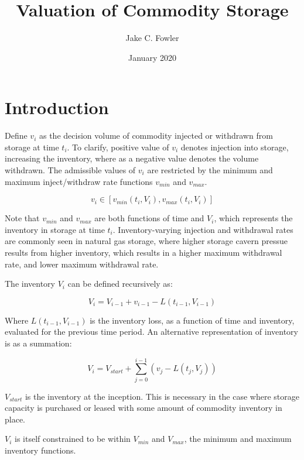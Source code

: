 \documentclass{article}
\title{Valuation of Commodity Storage}
\author{Jake C. Fowler}
\date{January 2020}
\begin{document}
\newcommand{\+}[1]{\ensuremath{\mathbf{#1}}}

\maketitle

\section{Introduction}
Define $v_i$ as the decision volume of commodity injected or withdrawn from storage at time
$t_i$. To clarify, positive value of $v_i$ denotes injection into storage, increasing the
inventory, where as a negative value denotes the volume withdrawn. The admissible values
of $v_i$ are restricted by the minimum and maximum inject/withdraw rate functions
$v_{min}$ and $v_{max}$.

\begin{equation}
    v_i \in [v_{min}(t_i, V_i), v_{max}(t_i, V_i)]
\end{equation}

Note that $v_{min}$ and $v_{max}$ are both functions of time and $V_i$, which represents the
inventory in storage at time $t_i$. Inventory-varying injection and withdrawal rates are commonly
seen in natural gas storage, where higher storage cavern pressue results from higher inventory,
which results in a higher maximum withdrawal rate, and lower maximum withdrawal rate.

\bigskip

The inventory $V_i$ can be defined recursively as:

\begin{equation}
    V_i = V_{i-1} + v_{i-1} - L(t_{i-1}, V_{i-1}) 
\end{equation}

Where $L(t_{i-1}, V_{i-1})$ is the inventory loss, as a function of time and inventory, 
evaluated for the previous time period. An alternative representation of inventory is 
as a summation:

\begin{equation}
    V_i = V_{start} + \sum\limits^{i-1}_{j=0} {(v_{j} - L(t_j, V_j))}
\end{equation}

$V_{start}$ is the inventory at the inception. This is necessary in the case where storage
capacity is purchased or leased with some amount of commodity inventory in place.

\bigskip

$V_i$ is itself constrained to be within $V_{min}$ and $V_{max}$, the minimum and maximum
inventory functions.
\end{document}
